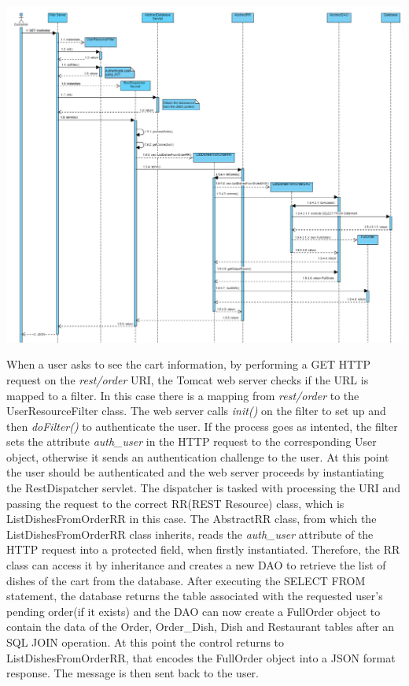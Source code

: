 \begin{center}
    \includegraphics[width=1.0\textwidth]{resources/Sequence-Diagram-List}
    \label{fig:sequence-diagram-list}
\end{center}

When a user asks to see the cart information, by performing a GET HTTP request on the \textit{rest/order} URI, the Tomcat web server checks if the URL is mapped to a filter. In this case there is a mapping from \textit{rest/order} to the UserResourceFilter class. The web server calls \textit{init()} on the filter to set up and then \textit{doFilter()} to authenticate the user. If the process goes as intented, the filter sets the attribute \textit{auth\_user} in the HTTP request to the corresponding User object, otherwise it sends an authentication challenge to the user.
At this point the user should be authenticated and the web server proceeds by instantiating the RestDispatcher servlet. The dispatcher is tasked with processing the URI and passing the request to the correct RR(REST Resource) class, which is ListDishesFromOrderRR in this case. The AbstractRR class, from which the ListDishesFromOrderRR class inherits, reads the \textit{auth\_user} attribute of the HTTP request into a protected field, when firstly instantiated. Therefore, the RR class can access it by inheritance and creates a new DAO to retrieve the list of dishes of the cart from the database. After executing the SELECT FROM statement, the database returns the table associated with the requested user's pending order(if it exists) and the DAO can now create a FullOrder object to contain the data of the Order, Order\_Dish, Dish and Restaurant tables after an SQL JOIN operation. At this point the control returns to ListDishesFromOrderRR, that encodes the FullOrder object into a JSON format response. The message is then sent back to the user.
